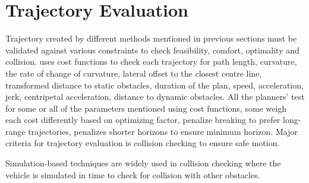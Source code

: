 \section{Trajectory Evaluation}
\label{traj_eval}
Trajectory created by different methods mentioned in previous sections must be validated against various constraints to check feasibility, comfort, optimality and collision. \cite{traj_planner_optimization} uses cost functions to check each trajectory for path length, curvature, the rate of change of curvature, lateral offset to the closest centre line, transformed distance to static obstacles, duration of the plan, speed, acceleration, jerk, centripetal acceleration, distance to dynamic obstacles. All the planners' test for some or all of the parameters mentioned using cost functions, some weigh each cost differently based on optimizing factor, \cite{unit_A_star} penalize breaking to prefer long-range trajectories, \cite{cmu_parallel_thesis} penalizes shorter horizons to ensure minimum horizon. Major criteria for trajectory evaluation is collision checking to ensure safe motion.

Simulation-based techniques are widely used in collision checking where the vehicle is simulated in time to check for collision with other obstacles.

